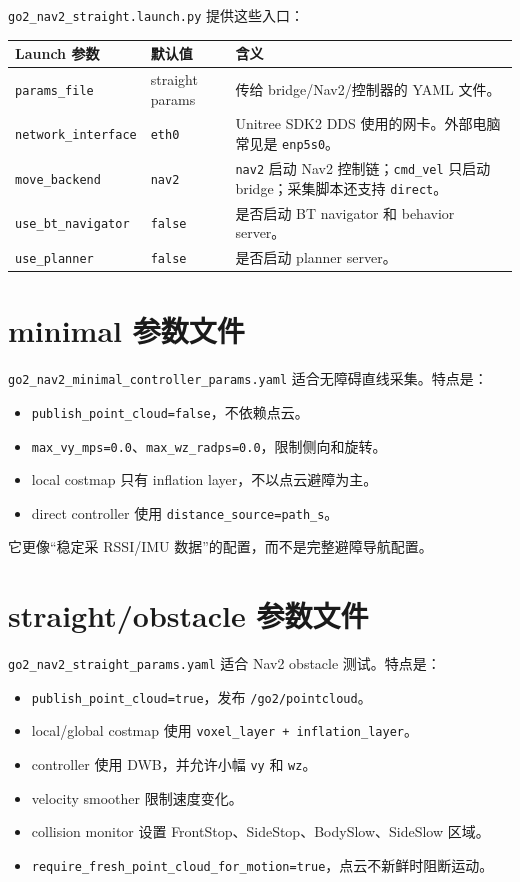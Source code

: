 \documentclass[UTF8,11pt,a4paper,openany]{ctexrep}
\newcommand{\code}[1]{\nolinkurl{#1}}
\newcommand{\file}[1]{\nolinkurl{#1}}
\newcommand{\topic}[1]{\nolinkurl{#1}}
\newcommand{\param}[1]{\nolinkurl{#1}}
\begin{document}
\file{go2_nav2_straight.launch.py} 提供这些入口：

\begin{longtable}{L{0.28\textwidth} L{0.18\textwidth} L{0.44\textwidth}}
\toprule
\textbf{Launch 参数} & \textbf{默认值} & \textbf{含义} \\
\midrule
\endhead
\param{params_file} & straight params & 传给 bridge/Nav2/控制器的 YAML 文件。\\
\param{network_interface} & \code{eth0} & Unitree SDK2 DDS 使用的网卡。外部电脑常见是 \code{enp5s0}。\\
\param{move_backend} & \code{nav2} & \code{nav2} 启动 Nav2 控制链；\code{cmd_vel} 只启动 bridge；采集脚本还支持 \code{direct}。\\
\param{use_bt_navigator} & \code{false} & 是否启动 BT navigator 和 behavior server。\\
\param{use_planner} & \code{false} & 是否启动 planner server。\\
\bottomrule
\end{longtable}

\section{minimal 参数文件}

\file{go2_nav2_minimal_controller_params.yaml} 适合无障碍直线采集。特点是：

\begin{itemize}
  \item \param{publish_point_cloud=false}，不依赖点云。
  \item \param{max_vy_mps=0.0}、\param{max_wz_radps=0.0}，限制侧向和旋转。
  \item local costmap 只有 inflation layer，不以点云避障为主。
  \item direct controller 使用 \param{distance_source=path_s}。
\end{itemize}

它更像“稳定采 RSSI/IMU 数据”的配置，而不是完整避障导航配置。

\section{straight/obstacle 参数文件}

\file{go2_nav2_straight_params.yaml} 适合 Nav2 obstacle 测试。特点是：

\begin{itemize}
  \item \param{publish_point_cloud=true}，发布 \topic{/go2/pointcloud}。
  \item local/global costmap 使用 \code{voxel_layer + inflation_layer}。
  \item controller 使用 DWB，并允许小幅 \code{vy} 和 \code{wz}。
  \item velocity smoother 限制速度变化。
  \item collision monitor 设置 FrontStop、SideStop、BodySlow、SideSlow 区域。
  \item \param{require_fresh_point_cloud_for_motion=true}，点云不新鲜时阻断运动。
\end{itemize}
\end{document}
